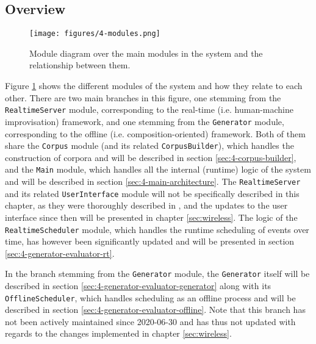 \subsection{Overview}\label{sec:4-overview}
 \begin{figure}[h]
    \centering        
 	\texttt{[image: figures/4-modules.png]}
    \caption{Module diagram over the main modules in the system and the relationship between them.}
    \label{fig:4-modules}
\end{figure}

\noindent Figure \ref{fig:4-modules} shows the different modules of the system and how they relate to each other. There are two main branches in this figure, one stemming from the \texttt{RealtimeServer} module, corresponding to the real-time (i.e. human-machine improvisation) framework, and one stemming from the \texttt{Generator} module, corresponding to the offline (i.e. composition-oriented) framework. Both of them share the \texttt{Corpus} module (and its related \texttt{CorpusBuilder}), which handles the construction of corpora and will be described in section \ref{sec:4-corpus-builder}, and the \texttt{Main} module, which handles all the internal (runtime) logic of the system and will be described in section \ref{sec:4-main-architecture}. The \texttt{RealtimeServer} and its related \texttt{UserInterface} module will not be specifically described in this chapter, as they were thoroughly described in \cite{borg_2019}, and the updates to the user interface since then will be presented in chapter \ref{sec:wireless}. The logic of the \texttt{RealtimeScheduler} module, which handles the runtime scheduling of events over time, has however been significantly updated and will be presented in section \ref{sec:4-generator-evaluator-rt}. 

In the branch stemming from the \texttt{Generator} module, the \texttt{Generator} itself will be described in section \ref{sec:4-generator-evaluator-generator} along with its \texttt{OfflineScheduler}, which handles scheduling as an offline process and will be described in section \ref{sec:4-generator-evaluator-offline}. Note that this branch has not been actively maintained since 2020-06-30 and has thus not updated with regards to the changes implemented in chapter \ref{sec:wireless}.